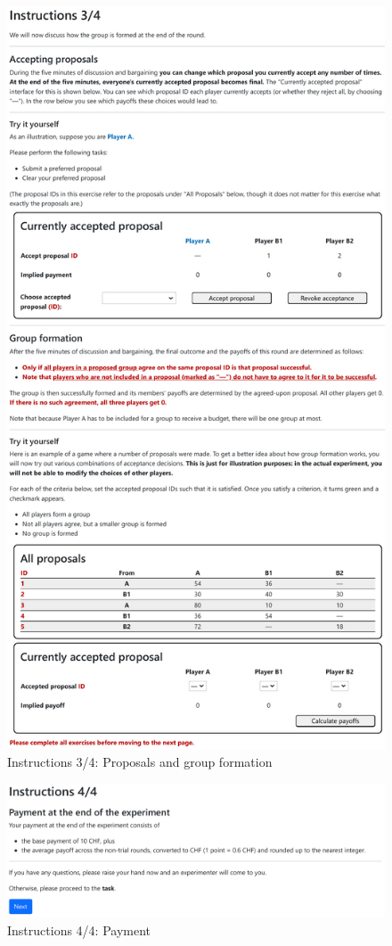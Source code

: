 \documentclass[12pt]{article}
\begin{document}
\begin{figure}[!htb]
    \centering
    \includegraphics[width=.7\linewidth]{screenshots/instructions_3.pdf}
    \caption{Instructions 3/4: Proposals and group formation}
\end{figure}

\begin{figure}[!htb]
    \centering
    \includegraphics[width=.9\linewidth]{screenshots/instructions_4.pdf}
    \caption{Instructions 4/4: Payment}
\end{figure}
\end{document}
